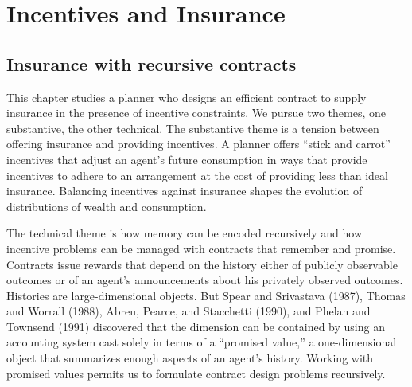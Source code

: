 %

%

\offparens

%
%
%



\overfullrule=0pt

\def\bull{\vrule height .9ex width .8ex depth -.1ex}
\def\bh{\penalty-100}
\chapter{Incentives and Insurance\label{socialinsurance}}%

\section{Insurance with recursive contracts}
 This chapter studies a planner who designs an efficient contract
to supply insurance in the presence of incentive constraints.
 We pursue two themes, one
substantive, the other technical.  The substantive theme is
 a tension between offering insurance and
providing incentives.  A planner  offers ``stick and carrot'' incentives that adjust
 an
agent's future consumption in ways that provide incentives to adhere to an arrangement at the cost of  providing less
than ideal insurance.
Balancing  incentives against insurance shapes the evolution of
distributions of wealth and consumption.

 
    
   
  The technical theme is how memory can be
encoded recursively and how  incentive problems can be managed with contracts
that remember  and  promise. Contracts  issue rewards
that depend on the history either of publicly observable outcomes
or of an agent's announcements about his privately observed
outcomes. Histories are large-dimensional objects.  But Spear and
Srivastava (1987), Thomas and Worrall (1988), Abreu, Pearce, and
Stacchetti (1990), and Phelan and Townsend (1991) discovered that
the dimension  can be contained by using an accounting
system cast solely in terms of a ``promised value,'' a
one-dimensional object that  summarizes  enough aspects of an
agent's history.  Working with promised values permits us to
formulate  contract design problems recursively.

